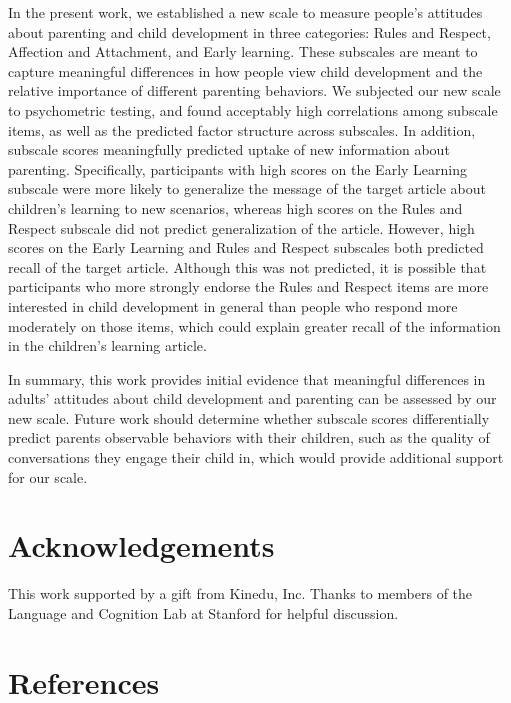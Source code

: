 \documentclass[10pt, letterpaper]{article}
\begin{document}
In the present work, we established a new scale to measure people's
attitudes about parenting and child development in three categories:
Rules and Respect, Affection and Attachment, and Early learning. These
subscales are meant to capture meaningful differences in how people view
child development and the relative importance of different parenting
behaviors. We subjected our new scale to psychometric testing, and found
acceptably high correlations among subscale items, as well as the
predicted factor structure across subscales. In addition, subscale
scores meaningfully predicted uptake of new information about parenting.
Specifically, participants with high scores on the Early Learning
subscale were more likely to generalize the message of the target
article about children's learning to new scenarios, whereas high scores
on the Rules and Respect subscale did not predict generalization of the
article. However, high scores on the Early Learning and Rules and
Respect subscales both predicted recall of the target article. Although
this was not predicted, it is possible that participants who more
strongly endorse the Rules and Respect items are more interested in
child development in general than people who respond more moderately on
those items, which could explain greater recall of the information in
the children's learning article.

In summary, this work provides initial evidence that meaningful
differences in adults' attitudes about child development and parenting
can be assessed by our new scale. Future work should determine whether
subscale scores differentially predict parents observable behaviors with
their children, such as the quality of conversations they engage their
child in, which would provide additional support for our scale.

\section{Acknowledgements}\label{acknowledgements}

This work supported by a gift from Kinedu, Inc. Thanks to members of the
Language and Cognition Lab at Stanford for helpful discussion.

\section{References}\label{references}

\small
\end{document}
